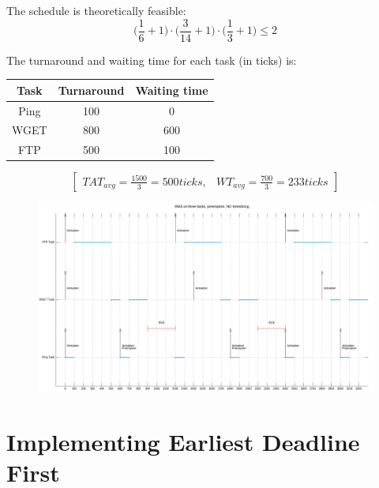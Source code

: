 \documentclass[10pt]{article}
\begin{document}
The schedule is theoretically feasible:
\[\bigg(\frac{1}{6}+1\bigg)\cdot\bigg(\frac{3}{14}+1\bigg)\cdot\bigg(\frac{1}{3}+1\bigg)\le 2\]

The turnaround and waiting time for each task (in ticks) is:
\begin{center}
\begin{tabular}{|c|c|c|}
\hline 
\rule[-1ex]{0pt}{2.5ex} Task & Turnaround & Waiting time \\ 
\hline 
\rule[-1ex]{0pt}{2.5ex} Ping & 100 & 0 \\ 
\hline 
\rule[-1ex]{0pt}{2.5ex} WGET & 800 & 600 \\ 
\hline 
\rule[-1ex]{0pt}{2.5ex} FTP & 500 & 100 \\ 
\hline 
\end{tabular} 
\end{center}
\[\begin{bmatrix}
TAT_{avg}=\frac{1500}{3}=500ticks, & WT_{avg}=\frac{700}{3}=233ticks
\end{bmatrix}\]

\begin{figure}[H]
    \centering
    \includegraphics[width=1.0\linewidth]{Pictures/RMSgantt2.png}
    \caption{}
    \label{fig:11}
\end{figure}
\newpage
\newpage
\section{Implementing Earliest Deadline First}
\end{document}
